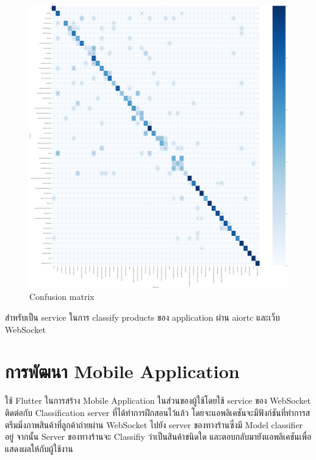   \begin{figure}[h]
    \begin{center}
    
    \includegraphics[scale=0.12]{pic/model/blind_pic_4_ccm.png}
    \end{center}
    
    \caption[Confusion matrix]{Confusion matrix}
    \label{fig:Confusion matrix}
    \end{figure}
   สำหรับเป็น service ในการ classify products ของ application ผ่าน aiortc  และเว็บ WebSocket

 
 
\newpage

\section{การพัฒนา Mobile Application}
ใช้ Flutter ในการสร้าง Mobile Application ในส่วนของผู้ใช้โดยใช้ service ของ WebSocket ติดต่อกับ Classification server ที่ได้ทำการฝึกสอนไว้แล้ว
โดยจะแอพลิเคชันจะมีฟังก์ชันที่ทำการสตรีมมิ่งภาพสินค้าที่ลูกค้าถ่ายผ่าน WebSocket ไปยัง server ของทางร้านซึ่งมี Model classifier อยู่
จากนั้น Server ของทางร้านจะ Classifiy ว่าเป็นสินค้าชนิดใด และตอบกลับมายังแอพลิเคชันเพื่อแสดงผลให้กับผู้ใช้งาน
